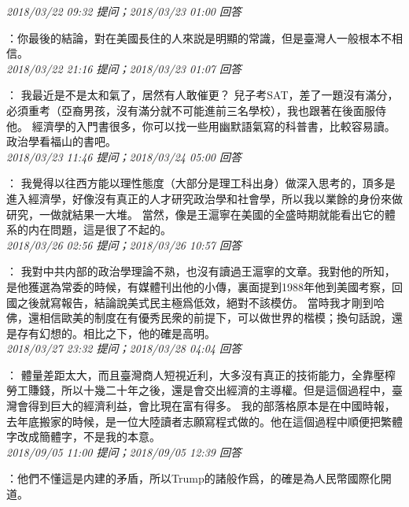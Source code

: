\documentclass[twocolumn]{ctexart}
\begin{document}
\textit{\hfill\noindent\small 2018/03/22 09:32 提问；2018/03/23 01:00 回答}

：你最後的結論，對在美國長住的人來説是明顯的常識，但是臺灣人一般根本不相信。
\\

\textit{\hfill\noindent\small 2018/03/22 21:16 提问；2018/03/23 01:07 回答}

：
我最近是不是太和氣了，居然有人敢催更？
兒子考SAT，差了一題沒有滿分，必須重考（亞裔男孩，沒有滿分就不可能進前三名學校），我也跟著在後面服侍他。
經濟學的入門書很多，你可以找一些用幽默語氣寫的科普書，比較容易讀。政治學看福山的書吧。
\\

\textit{\hfill\noindent\small 2018/03/23 11:46 提问；2018/03/24 05:00 回答}

：
我覺得以往西方能以理性態度（大部分是理工科出身）做深入思考的，頂多是進入經濟學，好像沒有真正的人才研究政治學和社會學，所以我以業餘的身份來做研究，一做就結果一大堆。
當然，像是王滬寧在美國的全盛時期就能看出它的體系的内在問題，這是很了不起的。
\\

\textit{\hfill\noindent\small 2018/03/26 02:56 提问；2018/03/26 10:57 回答}

：
我對中共内部的政治學理論不熟，也沒有讀過王滬寧的文章。我對他的所知，是他獲選為常委的時候，有媒體刊出他的小傳，裏面提到1988年他到美國考察，回國之後就寫報告，結論說美式民主極爲低效，絕對不該模仿。
當時我才剛到哈佛，還相信歐美的制度在有優秀民衆的前提下，可以做世界的楷模；換句話說，還是存有幻想的。相比之下，他的確是高明。
\\

\textit{\hfill\noindent\small 2018/03/27 23:32 提问；2018/03/28 04:04 回答}

：
體量差距太大，而且臺灣商人短視近利，大多沒有真正的技術能力，全靠壓榨勞工賺錢，所以十幾二十年之後，還是會交出經濟的主導權。但是這個過程中，臺灣會得到巨大的經濟利益，會比現在富有得多。
我的部落格原本是在中國時報，去年底搬家的時候，是一位大陸讀者志願寫程式做的。他在這個過程中順便把繁體字改成簡體字，不是我的本意。
\\

\textit{\hfill\noindent\small 2018/09/05 11:00 提问；2018/09/05 12:39 回答}

：他們不懂這是内建的矛盾，所以Trump的諸般作爲，的確是為人民幣國際化開道。
\\
\end{document}
